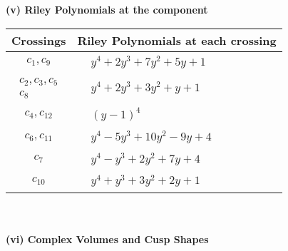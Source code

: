\documentclass[1p]{elsarticle_modified}
\theoremstyle{definition}
\begin{document}
\newpage\renewcommand{\arraystretch}{1}
\flushleft \textbf{(v) Riley Polynomials at the component}\newline \\
\begin{tabular}{m{50pt}|m{274pt}}
Crossings & \hspace{64pt}Riley Polynomials at each crossing \\
\hline $$\begin{aligned}c_{1},c_{9}\end{aligned}$$&$\begin{aligned}
&y^4+2 y^3+7 y^2+5 y+1
\end{aligned}$\\
\hline $$\begin{aligned}c_{2},c_{3},c_{5}\\c_{8}\end{aligned}$$&$\begin{aligned}
&y^4+2 y^3+3 y^2+y+1
\end{aligned}$\\
\hline $$\begin{aligned}c_{4},c_{12}\end{aligned}$$&$\begin{aligned}
&(y-1)^4
\end{aligned}$\\
\hline $$\begin{aligned}c_{6},c_{11}\end{aligned}$$&$\begin{aligned}
&y^4-5 y^3+10 y^2-9 y+4
\end{aligned}$\\
\hline $$\begin{aligned}c_{7}\end{aligned}$$&$\begin{aligned}
&y^4- y^3+2 y^2+7 y+4
\end{aligned}$\\
\hline $$\begin{aligned}c_{10}\end{aligned}$$&$\begin{aligned}
&y^4+y^3+3 y^2+2 y+1
\end{aligned}$\\
\hline
\end{tabular}\\~\\
\newpage\flushleft \textbf{(vi) Complex Volumes and Cusp Shapes}
\end{document}
